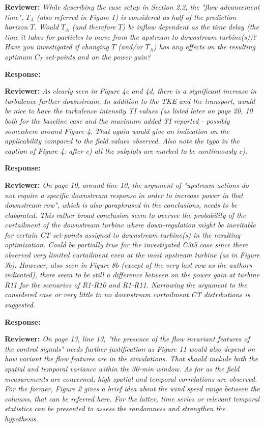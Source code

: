 \documentclass[]{article}
\begin{document}
\dotfill

\textbf{Reviewer: } \textit{While describing the case setup in Section 2.2, the "flow advancement time", $T_A$ (also
	referred in Figure 1) is considered as half of the prediction horizon $T$. Would $T_A$ (and
	therefore $T$) be inflow dependent as the time delay (the time it takes for particles to
	move from the upstream to downstream turbine(s))? Have you investigated if changing
	$T$ (and/or $T_A$) has any effects on the resulting optimum $C_T$ set-points and on the power
	gain?}

\textbf{Response: }

\dotfill

\textbf{Reviewer: } \textit{As clearly seen in Figure 4c and 4d, there is a significant increase in turbulence
	further downstream. In addition to the TKE and the transport, would be nice to have the
	turbulence intensity TI values (as listed later on page 20, 10%
	both for the baseline case and the maximum added TI reported - possibly somewhere
	around Figure 4. That again would give an indication on the applicability compared to
	the field values observed. Also note the typo in the caption of Figure 4: after c) all the
	subplots are marked to be continuously c).}

\textbf{Response: }

\dotfill

\textbf{Reviewer: } \textit{On page 10, around line 10, the argument of "upstream actions do not require a
	specific downstream response in order to increase power in that downstream row",
	which is also paraphrased in the conclusions, needs to be elaborated. This rather
	broad conclusion seem to oversee the probability of the curtailment of the downstream
	turbine where down-regulation might be inevitable for certain CT set-points assigned
	to downstream turbine(s) in the resulting optimization. Could be partially true for the
	investigated C3t5 case since there observed very limited curtailment even at the most
	upstream turbine (as in Figure 3b). However, also seen in Figure 8b (except of the
	very last row as the authors indicated), there seem to be still a difference between on
	the power gain at turbine R11 for the scenarios of R1-R10 and R1-R11. Narrowing the argument to the considered case or very little to no downstream curtailment CT
	distributions is suggested.}

\textbf{Response: }

\dotfill

\textbf{Reviewer: } \textit{On page 13, line 13, "the presence of the flow invariant features of the control signals"
	needs further justification as Figure 11 would also depend on how variant the flow
	features are in the simulations. That should include both the spatial and temporal
	variance within the 30-min window. As far as the field measurements are concerned,
	high spatial and temporal correlations are observed. For the former, Figure 2 gives a
	brief idea about the wind speed range between the columns, that can be referred here.
	For the latter, time series or relevant temporal statistics can be presented to assess the
	randomness and strengthen the hypothesis.}
\end{document}
